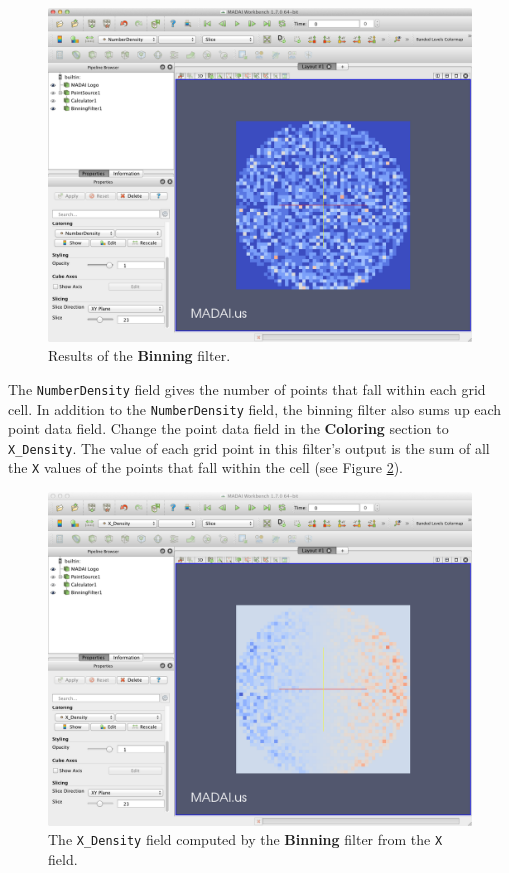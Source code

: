 \documentclass[12pt]{article}
\newcommand{\filter}[1]{\textbf{#1}}
\newcommand{\setting}[1]{\textbf{#1}}
\newcommand{\field}[1]{\texttt{#1}}
\begin{document}
\begin{figure}[htbp]
   \centering
   \includegraphics[scale=.25]{images/BinningFilter.png} %
   \caption{Results of the \filter{Binning} filter.}
   \label{fig:BinningFilter}
\end{figure}

The \field{NumberDensity} field gives the number of points that fall within each grid cell. In addition to the \field{NumberDensity} field, the binning filter also sums up each point data field. Change the point data field in the \setting{Coloring} section to \field{X\_Density}. The value of each grid point in this filter's output is the sum of all the \field{X} values of the points that fall within the cell (see Figure \ref{fig:BinningFilterXDensity}).

\begin{figure}[htbp]
   \centering
   \includegraphics[scale=.25]{images/BinningFilter_XDensity.png} %
   \caption{The \texttt{X\_Density} field computed by the \textbf{Binning} filter from the \texttt{X} field.}
   \label{fig:BinningFilterXDensity}
\end{figure}
\end{document}
